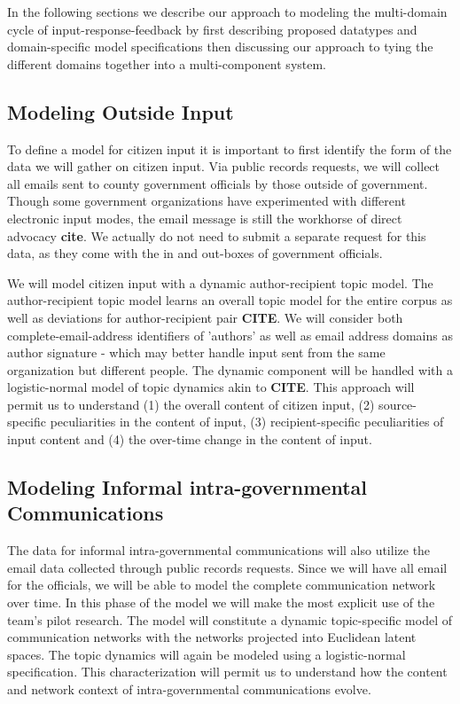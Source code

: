 In the following sections we describe our approach to modeling the multi-domain cycle of input-response-feedback by first describing proposed datatypes and domain-specific model specifications then discussing our approach to tying the different domains together into a multi-component system.

\subsection{Modeling Outside Input}

To define a model for citizen input it is important to first identify the form of the data we will gather on citizen input. Via public records requests, we will collect all emails sent to county government officials by those outside of government. Though some government organizations have experimented with different electronic input modes, the email message is still the workhorse of direct advocacy {\bf cite}. We actually do not need to submit a separate request for this data, as they come with the in and out-boxes of government officials. 

We will model citizen input with a dynamic author-recipient topic model. The author-recipient topic model learns an overall topic model for the entire corpus as well as deviations for author-recipient pair {\bf CITE}. We will consider both complete-email-address identifiers of 'authors' as well as email address domains as author signature - which may better handle input sent from the same organization but different people. The dynamic component will be handled with a logistic-normal model of topic dynamics akin to {\bf CITE}. This approach will permit us to understand (1) the overall content of citizen input, (2) source-specific peculiarities in the content of input, (3) recipient-specific peculiarities of input content and (4) the over-time change in the content of input.

\subsection{Modeling Informal intra-governmental Communications}

The data for informal intra-governmental communications will also utilize the email data collected through public records requests. Since we will have all email for the officials, we will be able to model the complete communication network over time. In this phase of the model we will make the most explicit use of the team's pilot research. The model will constitute a dynamic topic-specific model of communication networks with the networks projected into Euclidean latent spaces. The topic dynamics will again be modeled using a logistic-normal specification. This characterization will permit us to understand how the content and network context of intra-governmental communications evolve.

